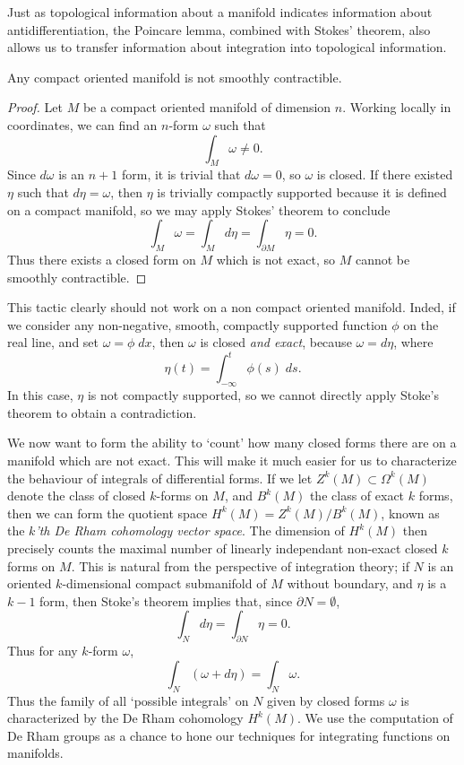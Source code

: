 Just as topological information about a manifold indicates information about antidifferentiation, the Poincare lemma, combined with Stokes' theorem, also allows us to transfer information about integration into topological information.

\begin{theorem}
    Any compact oriented manifold is not smoothly contractible.
\end{theorem}
\begin{proof}
    Let $M$ be a compact oriented manifold of dimension $n$. Working locally in coordinates, we can find an $n$-form $\omega$ such that
    \[ \int_M \omega \neq 0. \]
    Since $d\omega$ is an $n+1$ form, it is trivial that $d\omega = 0$, so $\omega$ is closed. If there existed $\eta$ such that $d\eta = \omega$, then $\eta$ is trivially compactly supported because it is defined on a compact manifold, so we may apply Stokes' theorem to conclude
    \[ \int_M \omega = \int_M d\eta = \int_{\partial M} \eta = 0. \]
    Thus there exists a closed form on $M$ which is not exact, so $M$ cannot be smoothly contractible.
\end{proof}

\begin{remark}
    This tactic clearly should not work on a non compact oriented manifold. Inded, if we consider any non-negative, smooth, compactly supported function $\phi$ on the real line, and set $\omega = \phi\; dx$, then $\omega$ is closed \emph{and exact}, because $\omega = d \eta$, where
    \[ \eta(t) = \int_{-\infty}^t \phi(s)\; ds. \]
    In this case, $\eta$ is not compactly supported, so we cannot directly apply Stoke's theorem to obtain a contradiction.
\end{remark}

We now want to form the ability to `count' how many closed forms there are on a manifold which are not exact. This will make it much easier for us to characterize the behaviour of integrals of differential forms. If we let $Z^k(M) \subset \Omega^k(M)$ denote the class of closed $k$-forms on $M$, and $B^k(M)$ the class of exact $k$ forms, then we can form the quotient space $H^k(M) = Z^k(M)/B^k(M)$, known as the \emph{$k$'th De Rham cohomology vector space}. The dimension of $H^k(M)$ then precisely counts the maximal number of linearly independant non-exact closed $k$ forms on $M$. This is natural from the perspective of integration theory; if $N$ is an oriented $k$-dimensional compact submanifold of $M$ without boundary, and $\eta$ is a $k-1$ form, then Stoke's theorem implies that, since $\partial N = \emptyset$,
%
\[ \int_N d\eta = \int_{\partial N} \eta = 0. \]
%
Thus for any $k$-form $\omega$,
%
\[ \int_N (\omega + d\eta) = \int_N \omega. \]
%
Thus the family of all `possible integrals' on $N$ given by closed forms $\omega$ is characterized by the De Rham cohomology $H^k(M)$. We use the computation of De Rham groups as a chance to hone our techniques for integrating functions on manifolds.


